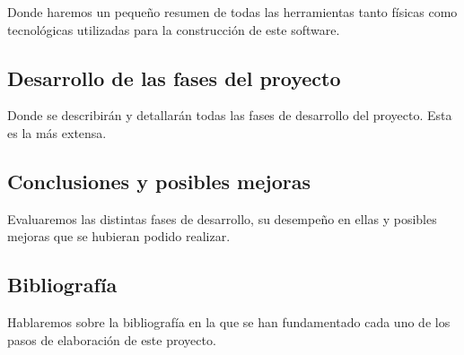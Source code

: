 Donde haremos un pequeño resumen de todas las herramientas tanto físicas como tecnológicas utilizadas para la construcción de este software.

\subsection{Desarrollo de las fases del proyecto}

Donde se describirán y detallarán todas las fases de desarrollo del proyecto. Esta es la más extensa.

\subsection{Conclusiones y posibles mejoras}

Evaluaremos las distintas fases de desarrollo, su desempeño en ellas y posibles mejoras que se hubieran podido realizar.

\subsection{Bibliografía}

Hablaremos sobre la bibliografía en la que se han fundamentado cada uno de los pasos de elaboración de este proyecto.